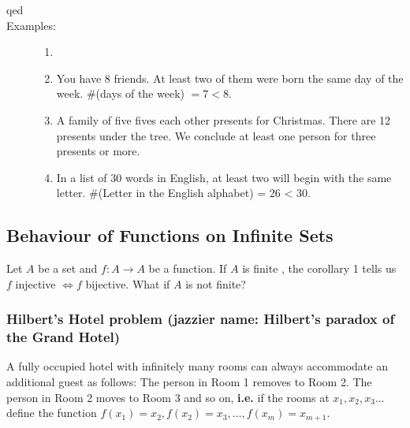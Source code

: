 \documentclass[10pt]{article}
\begin{document}
\begin{description}
		\item[qed]
		\item[Examples:]
		\begin{enumerate}
			\item[]
			\item You have 8 friends. At least two of them were born the same day of the week. \#(days of the week) $= 7 < 8$.
			\item A family of five fives each other presents for Christmas. There are 12 presents under the tree. We conclude at least one person for three presents or more.
			\item In a list of 30 words in English, at least two will begin with the same letter. \#(Letter in the English alphabet) = 26 < 30.
		\end{enumerate}
	\end{description}
	
	\subsection{Behaviour of Functions on Infinite Sets}
	Let $A$ be a set and $f:A \rightarrow A$ be a function. If $A$ is finite , the corollary 1 tells us $f$ injective $\Leftrightarrow f$ bijective. What if $A$ is not finite?
	
	\subsubsection{Hilbert's Hotel problem (jazzier name: Hilbert's paradox of the Grand Hotel)}
	A fully occupied hotel with infinitely many rooms can always accommodate an additional guest as follows: The person in Room 1 removes to Room 2. The person in Room 2 moves to Room 3 and so on, \textbf{i.e.} if the rooms at $x_1, x_2, x_3\dots$ define the function $f(x_1)=x_2, f(x_2)=x_3, \dots, f(x_m) = x_{m+1}$.
	
\end{document}
